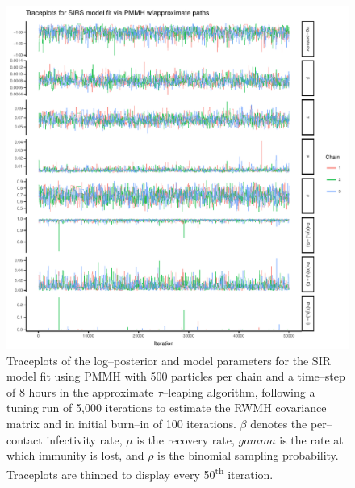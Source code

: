 \begin{figure}[htbp]
	\centering
	\includegraphics[width=0.9\linewidth]{figures/sirs_pomp_approx_traceplots}
	\caption{Traceplots of the log--posterior and model parameters for the SIR model fit using PMMH with 500 particles per chain and a time--step of 8 hours in the approximate $ \tau $--leaping algorithm, following a tuning run of 5,000 iterations to estimate the RWMH covariance matrix and in initial burn--in of 100 iterations. $ \beta $ denotes the per--contact infectivity rate, $ \mu $ is the recovery rate, $ gamma $ is the rate at which immunity is lost, and $ \rho $ is the binomial sampling probability. Traceplots are thinned to display every 50\textsuperscript{th} iteration.}
	\label{fig:sirspompapproxtraceplots}
\end{figure}

